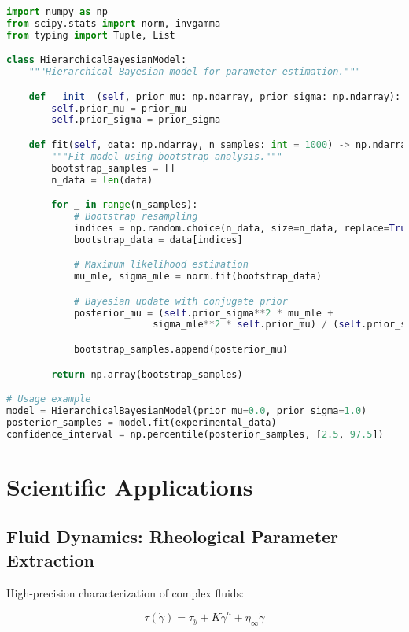 \documentclass[11pt,a4paper]{article}
\begin{document}
\begin{lstlisting}[language=Python, caption=Bayesian Parameter Estimation]
import numpy as np
from scipy.stats import norm, invgamma
from typing import Tuple, List

class HierarchicalBayesianModel:
    """Hierarchical Bayesian model for parameter estimation."""

    def __init__(self, prior_mu: np.ndarray, prior_sigma: np.ndarray):
        self.prior_mu = prior_mu
        self.prior_sigma = prior_sigma

    def fit(self, data: np.ndarray, n_samples: int = 1000) -> np.ndarray:
        """Fit model using bootstrap analysis."""
        bootstrap_samples = []
        n_data = len(data)

        for _ in range(n_samples):
            # Bootstrap resampling
            indices = np.random.choice(n_data, size=n_data, replace=True)
            bootstrap_data = data[indices]

            # Maximum likelihood estimation
            mu_mle, sigma_mle = norm.fit(bootstrap_data)

            # Bayesian update with conjugate prior
            posterior_mu = (self.prior_sigma**2 * mu_mle +
                          sigma_mle**2 * self.prior_mu) / (self.prior_sigma**2 + sigma_mle**2)

            bootstrap_samples.append(posterior_mu)

        return np.array(bootstrap_samples)

# Usage example
model = HierarchicalBayesianModel(prior_mu=0.0, prior_sigma=1.0)
posterior_samples = model.fit(experimental_data)
confidence_interval = np.percentile(posterior_samples, [2.5, 97.5])
\end{lstlisting}

\section{Scientific Applications}
\label{sec:applications}

\subsection{Fluid Dynamics: Rheological Parameter Extraction}
\label{subsec:fluid_dynamics}

High-precision characterization of complex fluids:

\begin{equation}
\tau(\dot{\gamma}) = \tau_y + K \dot{\gamma}^n + \eta_\infty \dot{\gamma}
\label{eq:extended_hb}
\end{equation}
\end{document}

